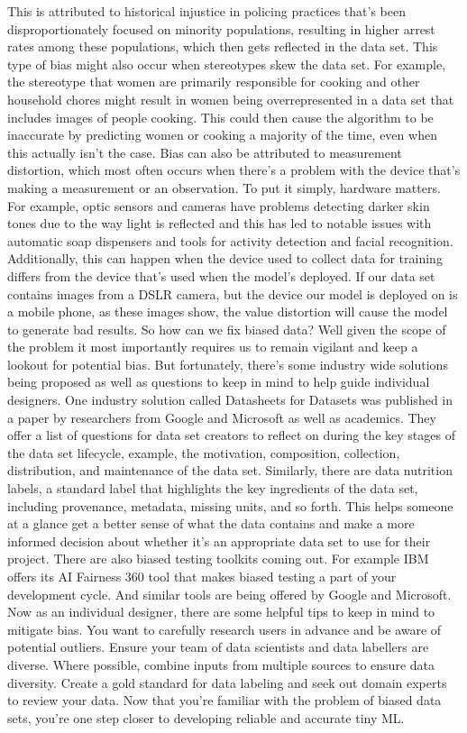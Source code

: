 This is attributed to historical injustice
in policing practices that's been disproportionately focused
on minority populations, resulting in higher arrest
rates among these populations, which then gets reflected in the data set.
This type of bias might also occur when stereotypes skew the data set.
For example, the stereotype that women are primarily
responsible for cooking and other household chores
might result in women being overrepresented in a data set that
includes images of people cooking.
This could then cause the algorithm to be
inaccurate by predicting women or cooking a majority of the time, even
when this actually isn't the case.
Bias can also be attributed to measurement distortion, which
most often occurs when there's a problem with the device that's
making a measurement or an observation.
To put it simply, hardware matters.
For example, optic sensors and cameras have
problems detecting darker skin tones due to the way light is reflected
and this has led to notable issues with automatic soap dispensers
and tools for activity detection and facial recognition.
Additionally, this can happen when the device used
to collect data for training differs from the device that's
used when the model's deployed.
If our data set contains images from a DSLR camera,
but the device our model is deployed on is a mobile phone,
as these images show, the value distortion
will cause the model to generate bad results.
So how can we fix biased data?
Well given the scope of the problem it most importantly
requires us to remain vigilant and keep a lookout for potential bias.
But fortunately, there's some industry wide solutions being proposed
as well as questions to keep in mind to help guide individual designers.
One industry solution called Datasheets for Datasets was published in a paper
by researchers from Google and Microsoft as well as academics.
They offer a list of questions for data set creators
to reflect on during the key stages of the data set lifecycle, example,
the motivation, composition, collection, distribution,
and maintenance of the data set.
Similarly, there are data nutrition labels,
a standard label that highlights the key ingredients of the data set,
including provenance, metadata, missing units, and so forth.
This helps someone at a glance get a better sense of what the data contains
and make a more informed decision about whether it's an appropriate data set
to use for their project.
There are also biased testing toolkits coming out.
For example IBM offers its AI Fairness 360 tool
that makes biased testing a part of your development cycle.
And similar tools are being offered by Google and Microsoft.
Now as an individual designer, there are some helpful tips
to keep in mind to mitigate bias.
You want to carefully research users in advance
and be aware of potential outliers.
Ensure your team of data scientists and data labellers are diverse.
Where possible, combine inputs from multiple sources
to ensure data diversity.
Create a gold standard for data labeling and seek out domain experts
to review your data.
Now that you're familiar with the problem of biased data sets,
you're one step closer to developing reliable and accurate tiny ML.


